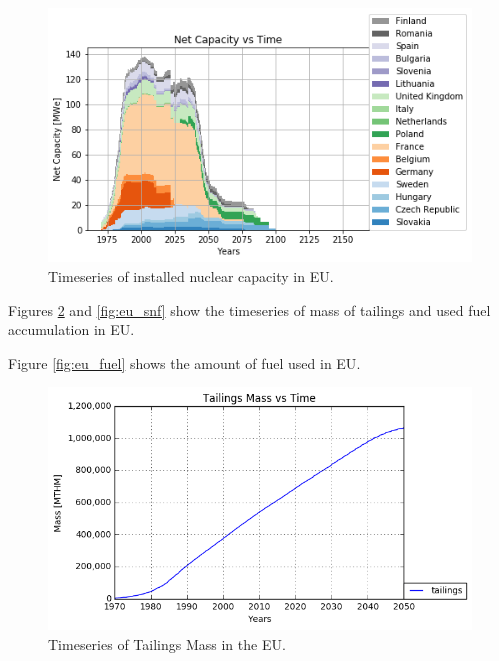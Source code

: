\begin{figure}[htbp!]
	\begin{center}
		\includegraphics[scale=0.7]{./images/eu_future/power_plot.png}
	\end{center}
	\caption{Timeseries of installed nuclear capacity in \gls{EU}.}
	\label{fig:eu_pow}
\end{figure}
\FloatBarrier


Figures \ref{fig:eu_tail} and \ref{fig:eu_snf} show the 
timeseries of mass of tailings and used fuel accumulation in \gls{EU}.

Figure \ref{fig:eu_fuel} shows the amount of fuel used in \gls{EU}.


\begin{figure}[htbp!]
	\begin{center}
		\includegraphics[scale=0.7]{./images/eu_future/tailings.png}
	\end{center}
	\caption{Timeseries of Tailings Mass in the \gls{EU}.}
	\label{fig:eu_tail}
\end{figure}

